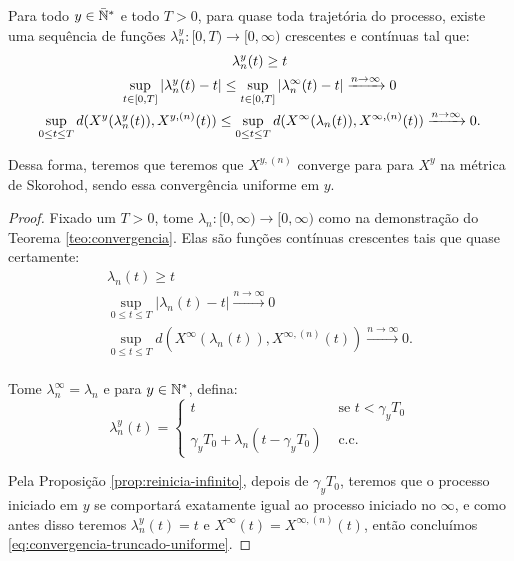 \begin{corolario}
  \label{cor:convergencia}
  Para todo $y \in {\mathbb{\bar{N}^*}}$ e todo $T > 0$, para quase toda trajetória do
  processo, existe uma sequência de funções $\lambda^y_n: [0, T) \to
  [0, \infty)$ crescentes e contínuas tal que:
  \begin{gather}
    \label{eq:convergencia-truncado-uniforme}
    \lambda^y_n(t) \geq t \\
    \sup_{t \in [0, T]} |\lambda^y_n(t) - t| \leq
    \sup_{t \in [0, T]} |\lambda^\infty_n(t) - t|
    \xrightarrow{n \to \infty} 0 \notag\\
    \sup_{0 \leq t \leq T} d(X^y(\lambda_n^y(t)), X^{y, (n)}(t)) \leq
    \sup_{0 \leq t \leq T} d(X^\infty(\lambda_n(t)), X^{\infty, (n)}(t))
    \xrightarrow{n\to\infty} 0. \notag
  \end{gather}
  
  Dessa forma, teremos que teremos que $X^{y, (n)}$ converge \qc para
  para $X^y$ na métrica de Skorohod, sendo essa convergência uniforme
  em $y$.
\end{corolario}
\begin{proof}
  Fixado um $T > 0$, tome $\lambda_n: [0, \infty) \to [0, \infty)$
  como na demonstração do Teorema \ref{teo:convergencia}. Elas são
  funções contínuas crescentes tais que quase certamente:
  \begin{gather*}
    \lambda_n(t) \geq t\\
    \sup_{0 \leq t \leq T} |\lambda_n(t) - t|
    \xrightarrow{n\to\infty} 0 \\
    \sup_{0 \leq t \leq T} d(X^\infty(\lambda_n(t)), X^{\infty, (n)}(t))
    \xrightarrow{n\to\infty} 0. \\
  \end{gather*}

  Tome $\lambda^\infty_n = \lambda_n$ e para $y \in {\mathbb{N^*}}$, defina:
  \begin{displaymath}
    \lambda_n^y(t) = \begin{cases}
      t & \textrm{ se } t < \gamma_y T_0\\
      \gamma_yT_0 + \lambda_n(t - \gamma_y T_0) & \textrm{ c.c.}
    \end{cases}
  \end{displaymath}


  Pela Proposição \ref{prop:reinicia-infinito}, depois de $\gamma_y
  T_0$, teremos que o processo iniciado em $y$ se comportará
  exatamente igual ao processo iniciado no $\infty$, e como antes
  disso teremos $\lambda^y_n(t) = t$ e $X^\infty(t) = X^{\infty,
    (n)}(t)$, então concluímos
  \eqref{eq:convergencia-truncado-uniforme}.

\end{proof}

